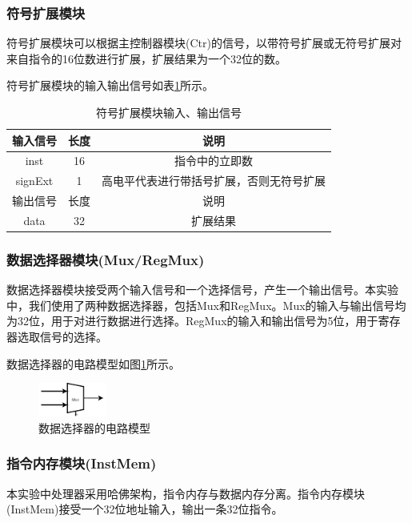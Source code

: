 \documentclass[UTF8]{ctexart}
\begin{document}
\subsubsection{符号扩展模块}
    符号扩展模块可以根据主控制器模块(Ctr)的信号，以带符号扩展或无符号扩展对来自指令的16位数进行扩展，扩展结果为一个32位的数。\par
    符号扩展模块的输入输出信号如表\ref{tab:signext-input-output-sig}所示。
    \begin{table}[htbp]
        \centering
        \begin{tabular}{|c|c|c|}
        \hline
        输入信号 & 长度 & 说明 \\ 
        \hline
        inst & 16 & 指令中的立即数 \\
        signExt & 1 & 高电平代表进行带括号扩展，否则无符号扩展 \\
        \hline
        \hline
        输出信号 & 长度 & 说明 \\ 
        \hline
        data & 32 & 扩展结果\\
        \hline
        \end{tabular}
        \caption{符号扩展模块输入、输出信号}
        \label{tab:signext-input-output-sig}
        \end{table}
    
\subsubsection{数据选择器模块(Mux/RegMux)}
    数据选择器模块接受两个输入信号和一个选择信号，产生一个输出信号。本实验中，我们使用了两种数据选择器，包括Mux和RegMux。Mux的输入与输出信号均为32位，用于对进行数据进行选择。RegMux的输入和输出信号为5位，用于寄存器选取信号的选择。\par
    数据选择器的电路模型如图\ref{fig:mux}所示。\par
    \begin{figure}[H]
        \centering
        \includegraphics[width=0.2\textwidth]{fig-mux.png}
        \caption{数据选择器的电路模型}
        \label{fig:mux}
    \end{figure}

\subsubsection{指令内存模块(InstMem)}
    本实验中处理器采用哈佛架构，指令内存与数据内存分离。指令内存模块(InstMem)接受一个32位地址输入，输出一条32位指令。
\end{document}
